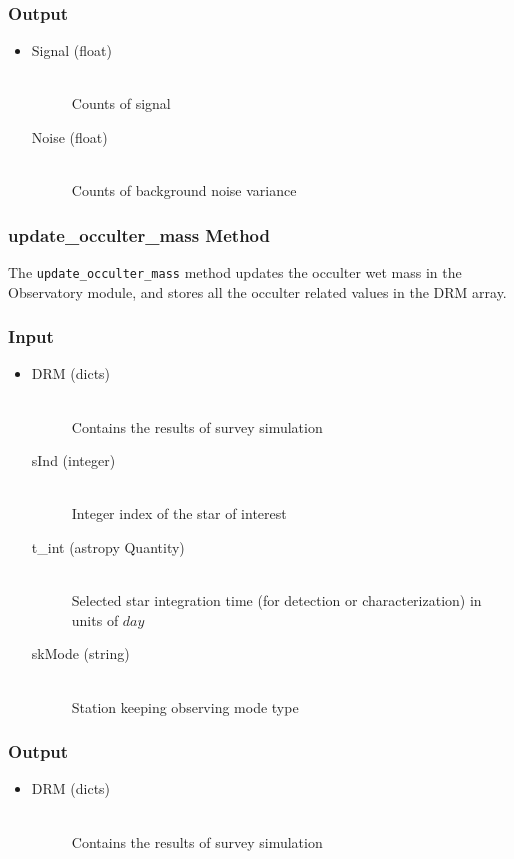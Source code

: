 \documentclass[cleanfoot]{asme2ej}
\begin{document}
\subsubsection*{Output}
\begin{itemize}
\item
\begin{description}
    \item[Signal (float)] \hfill \\ Counts of signal
    \item[Noise (float)] \hfill \\ Counts of background noise variance
\end{description}
\end{itemize}

\subsubsection{update\_occulter\_mass Method} \label{sec:updateoccultermasstask}
The \verb+update_occulter_mass+ method updates the occulter wet mass in the Observatory module, and stores all the occulter related values in the DRM array. 

\subsubsection*{Input}
\begin{itemize}
\item
\begin{description}
    \item[DRM (dicts)] \hfill \\ Contains the results of survey simulation
    \item[sInd (integer)] \hfill \\ Integer index of the star of interest
    \item[t\_int (astropy Quantity)] \hfill \\ Selected star integration time (for detection or characterization) in units of $day$
    \item[skMode (string)] \hfill \\ Station keeping observing mode type
\end{description}
\end{itemize}

\subsubsection*{Output}
\begin{itemize}
\item
\begin{description}
    \item[DRM (dicts)] \hfill \\ Contains the results of survey simulation
\end{description}
\end{itemize}
\end{document}
